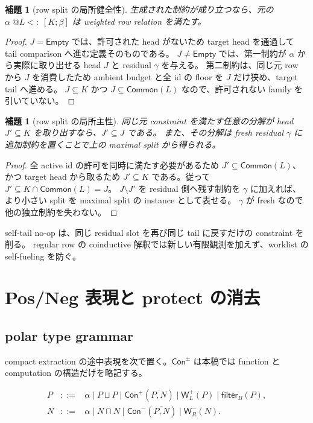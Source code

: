 \documentclass[uplatex,dvipdfmx,a4paper,10.5pt]{jsarticle}
\makeatletter
\theoremstyle{jpplain}
\newtheorem{lemma}[definition]{補題}
\newcommand{\Empty}{\mathsf{Empty}}
\newcommand{\Common}{\mathsf{Common}}
\newcommand{\Filter}[2]{\mathsf{filter}_{#1}(#2)}
\newcommand{\PWeight}[2]{\mathsf{W}^{+}_{#1}(#2)}
\newcommand{\NWeight}[2]{\mathsf{W}^{-}_{#1}(#2)}
\newcommand{\row}[2]{[#1;#2]}
\newcommand{\lsub}[3]{#1\;@#2\mathrel{<:}\;#3}
\newcommand{\kw}[1]{\mathsf{#1}}
\makeatother
\begin{document}
\begin{lemma}[row split の局所健全性]
生成された制約が成り立つなら、元の
$\lsub{\alpha}{L}{\row{K}{\beta}}$ は weighted row relation を満たす。
\end{lemma}

\begin{proof}
$J=\Empty$ では、許可された head がないため target head を通過して tail comparison へ進む定義そのものである。
$J\neq\Empty$ では、第一制約が $\alpha$ から実際に取り出せる head $J$ と residual $\gamma$ を与える。
第二制約は、同じ元 row から $J$ を消費したため ambient budget と全 id の floor を $J$ だけ狭め、target tail へ進める。
$J\subseteq K$ かつ $J\subseteq\Common(L)$ なので、許可されない family を引いていない。
\end{proof}

\begin{lemma}[row split の局所主性]
同じ元 constraint を満たす任意の分解が head $J'\subseteq K$ を取り出すなら、$J'\subseteq J$ である。
また、その分解は fresh residual $\gamma$ に追加制約を置くことで上の maximal split から得られる。
\end{lemma}

\begin{proof}
全 active id の許可を同時に満たす必要があるため $J'\subseteq\Common(L)$、かつ target head から取るため
$J'\subseteq K$ である。従って $J'\subseteq K\cap\Common(L)=J$。
$J\setminus J'$ を residual 側へ残す制約を $\gamma$ に加えれば、より小さい split を maximal split の instance として表せる。
$\gamma$ が fresh なので他の独立制約を失わない。
\end{proof}

self-tail no-op は、同じ residual slot を再び同じ tail に戻すだけの constraint を削る。
regular row の coinductive 解釈では新しい有限観測を加えず、worklist の self-fueling を防ぐ。

\section{Pos/Neg 表現と protect の消去}

\subsection{polar type grammar}

compact extraction の途中表現を次で置く。$\kw{Con}^{\pm}$ は本稿では function と computation の構造だけを略記する。

\[
\begin{array}{rcl}
P &::=& \alpha \mid P\sqcup P \mid \kw{Con}^{+}(\overline{P,N})
       \mid \PWeight{L}{P} \mid \Filter{B}{P},\\
N &::=& \alpha \mid N\sqcap N \mid \kw{Con}^{-}(\overline{P,N})
       \mid \NWeight{R}{N}.
\end{array}
\]
\end{document}
